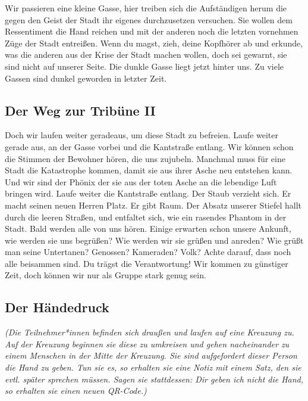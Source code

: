 \documentclass[a4paper, 12pt]{report}
\begin{document}
Wir passieren eine kleine Gasse, hier treiben sich die Aufständigen herum die gegen den Geist der Stadt ihr eigenes durchzusetzen versuchen.
Sie wollen dem Ressentiment die Hand reichen und mit der anderen noch die letzten vornehmen Züge der Stadt entreißen.
Wenn du magst, zieh, deine Kopfhörer ab und erkunde, was die anderen aus der Krise der Stadt machen wollen, doch sei gewarnt, sie sind nicht auf unserer Seite.
Die dunkle Gasse liegt jetzt hinter uns. 
Zu viele Gassen sind dunkel geworden in letzter Zeit.\\

\subsection{Der Weg zur Tribüne II}
Doch wir laufen weiter geradeaus, um diese Stadt zu befreien.
Laufe weiter gerade aus, an der Gasse vorbei und die Kantstraße entlang. 
Wir können schon die Stimmen der Bewohner hören, die uns zujubeln. 
Manchmal muss für eine Stadt die Katastrophe kommen, damit sie aus ihrer Asche neu entstehen kann.
Und wir sind der Phönix der sie aus der toten Asche an die lebendige Luft bringen wird.
Laufe weiter die Kantstraße entlang.
Der Staub verzieht sich. 
Er macht seinen neuen Herren Platz. 
Er gibt Raum.
Der Absatz unserer Stiefel hallt durch die leeren Straßen, und entfaltet sich, wie ein rasendes Phantom in der Stadt.
Bald werden alle von uns hören.
Einige erwarten schon unsere Ankunft, wie werden sie uns begrüßen?
Wie werden wir sie grüßen und anreden?
Wie grüßt man seine Untertanen? Genossen? Kameraden? Volk? 
Achte darauf, dass noch alle beisammen sind. 
Du trägst die Verantwortung!
Wir kommen zu günstiger Zeit, doch können wir nur als Gruppe stark genug sein.\\

\subsection{Der Händedruck}
\textit{(Die Teilnehmer*innen befinden sich draußen und laufen auf eine Kreuzung zu. 
Auf der Kreuzung beginnen sie diese zu umkreisen und gehen nacheinander zu einem Menschen in der Mitte der Kreuzung.
Sie sind aufgefordert dieser Person die Hand zu geben.
Tun sie es, so erhalten sie eine Notiz mit einem Satz, den sie evtl. später sprechen müssen.
Sagen sie stattdessen: \glqq \textit{Dir} geben ich nicht die Hand\grqq, so erhalten sie einen neuen QR-Code.)}\\
\end{document}
